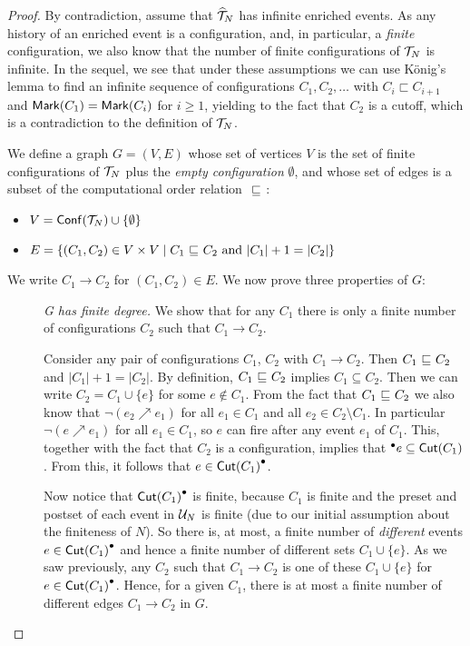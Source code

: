 \begin{proof}
By contradiction, assume that $\widehat{\mathcal{T}}_{N}$ has infinite enriched events. As any
history of an enriched event is a configuration, and, in particular, a
\emph{finite} configuration, we also know that the number of finite
configurations of $\mathcal{T}_{N}$ is infinite.  In the sequel, we see that under
these assumptions we can use K\"{o}nig's lemma to find an infinite sequence of
configurations $C_1, C_2, \ldots$ with $C_i \sqsubset C_{i+1}$ and
$\mathsf{Mark }{(C_1)} = \mathsf{Mark }{(C_i)}$ for $i \ge 1$, yielding to the fact that $C_2$
is a cutoff, which is a contradiction to the definition of $\mathcal{T}_{N}$.

We define a graph $G = (V, E)$ whose set of vertices $V$ is the set of finite
configurations of $\mathcal{T}_{N}$ plus the \textit{empty configuration}
$\emptyset$, and whose set of edges is a subset of the computational order
relation ${\ \sqsubseteq \ }$:

\begin{itemize}
\item $V = \mathsf{Conf}(\mathcal{T}_{N}) \cup \{\emptyset\}$
\item $E = \{(C_1, C_2) \in V \times V \mid C_1 {\ \sqsubseteq \ } C_2 \text{ and }
|C_1| + 1 = |C_2|\}$
\end{itemize}

We write $C_1 \to C_2$ for $(C_1, C_2) \in E$.  We now prove three properties
of $G$:

\begin{description}
\item[] \emph{G has finite degree.}  We show that for any $C_1$ there is only a
finite number of configurations $C_2$ such that $C_1 \to C_2$.

Consider any pair of configurations $C_1$, $C_2$ with $C_1 \to C_2$.  Then $C_1
{\ \sqsubseteq \ } C_2$ and $|C_1| + 1 = |C_2|$.  By definition, $C_1 {\ \sqsubseteq \ } C_2$
implies $C_1 \subseteq C_2$.  Then we can write $C_2 = C_1 \cup \{e\}$ for some
$e \notin C_1$.  From the fact that $C_1 {\ \sqsubseteq \ } C_2$ we also know that
$\lnot (e_2 \nearrow e_1)$ for all $e_1 \in C_1$ and all $e_2 \in C_2 \setminus
C_1$.  In particular $\lnot (e \nearrow e_1)$ for all $e_1 \in C_1$, so $e$ can
fire after any event $e_1$ of $C_1$.  This, together with the fact that $C_2$
is a configuration, implies that ${}^\bullet e \subseteq \mathsf{Cut }{(C_1)}$. From this, it
follows that $e \in \mathsf{Cut }{(C_1)}^\bullet$.

Now notice that $\mathsf{Cut }{(C_1)}^\bullet$ is finite, because $C_1$ is finite and the
preset and postset of each event in $\mathcal{U}_{N}$ is finite (due to our initial
assumption about the finiteness of $N$).  So there is, at most, a finite number
of \emph{different} events $e \in \mathsf{Cut }{(C_1)}^\bullet$ and hence a finite number
of different sets $C_1 \cup \{e\}$.  As we saw previously, any $C_2$ such that
$C_1 \to C_2$ is one of these $C_1 \cup \{e\}$ for $e \in \mathsf{Cut }{(C_1)}^\bullet$.
Hence, for a given $C_1$, there is at most a finite number of different edges
$C_1 \to C_2$ in $G$.


\end{description}
\end{proof}
